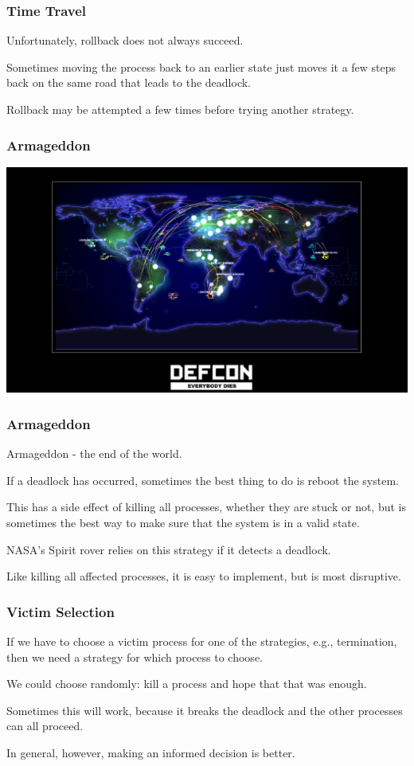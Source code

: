 \begin{frame}
	\frametitle{Time Travel}

	Unfortunately, rollback does not always succeed.

	Sometimes moving the process back to an earlier state just moves it a few steps back on the same road that leads to the deadlock.

	Rollback may be attempted a few times before trying another strategy.

\end{frame}


\begin{frame}
	\frametitle{Armageddon}

	\begin{center}
		\includegraphics[width=\textwidth]{images/defcon.jpg}
	\end{center}

\end{frame}


\begin{frame}
	\frametitle{Armageddon}

	Armageddon - the end of the world.

	If a deadlock has occurred, sometimes the best thing to do is reboot the system.

	This has a side effect of killing all processes, whether they are stuck or not, but is sometimes the best way to make sure that the system is in a valid state.

	NASA's Spirit rover relies on this strategy if it detects a deadlock.

	Like killing all affected processes, it is easy to implement, but is most disruptive.

\end{frame}

\begin{frame}
	\frametitle{Victim Selection}

	If we have to choose a victim process for one of the strategies, e.g., termination, then we need a strategy for which process to choose.

	We could choose randomly: kill a process and hope that that was enough.

	Sometimes this will work, because it breaks the deadlock and the other processes can all proceed.

	In general, however, making an informed decision is better.

\end{frame}

